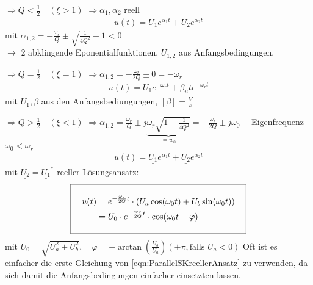 \begin{description}
[style=multiline,topsep=0pt,leftmargin=1.5cm]
\item[(1)]
$\Longrightarrow Q < \frac{1}{2} \quad (\xi > 1)$ \newline
$\Longrightarrow \alpha_1, \alpha_2$ reell
\begin{align}
\boxed{u(t) = U_1 e^{\alpha_1 t} + U_2 e^{\alpha_2 t}}
\end{align}
mit $\alpha_{1,2} = -\frac{\omega_r}{Q} \pm \sqrt{\frac{1}{4Q^2}-1} < 0$ \\
$\longrightarrow$ 2 abklingende Eponentialfunktionen, $U_{1,2}$ aus
Anfangsbedingungen.

\item[(2)]
$\Longrightarrow Q = \frac{1}{2} \quad (\xi = 1)$ \newline
$\Longrightarrow \alpha_{1,2} = -\frac{\omega_r}{2Q} \pm 0 = -\omega_r$
\begin{align}
\boxed{u(t) = U_1 e^{-\omega_r t} + \beta_u t e^{-\omega_r t}}
\end{align} 
mit $U_1, \beta$ aus den Anfangsbediungungen, $[\beta] = \frac{V}{s}$

\item[(3)]
$\Longrightarrow Q > \frac{1}{2} \quad (\xi < 1)$ \newline
$\Longrightarrow \alpha_{1,2} = \frac{\omega_r}{Q} \pm
j\underbrace{\omega_r\sqrt{1-\frac{1}{4Q^2}}}_{=w_0} = -\frac{\omega_r}{2Q} \pm
j \omega_0 \quad $ Eigenfrequenz $\omega_0 < \omega_r$
\begin{align}
\boxed{u(t) = \underline{U_1} e^{\alpha_1 t} + \underline{U_2} e^{\alpha_2 t}}
\end{align}
mit $\underline{U_2} = \underline{U_1}^\ast$ \newline
reeller Lösungsansatz:
\begin{equation}
\addtolength{\fboxsep}{10pt}
\boxed{
	\begin{split}
		u(t) &= e^{-\frac{\omega_r}{2Q}t} \cdot (U_a \cos(\omega_0 t) + 
				U_b \sin(\omega_0 t))\\
 		&= U_0 \cdot e^{-\frac{\omega_r}{2Q}t} \cdot \cos(\omega_0 t + \varphi)
	\end{split}\label{eqn:ParallelSKreellerAnsatz}
	}
\end{equation}
mit $U_0 = \sqrt{U_a^2 + U_b^2}, \quad \varphi = -\arctan(\frac{U_b}{U_a}) (+
\pi, \text{falls } U_a < 0)$ \newline
Oft ist es einfacher die erste Gleichung von \ref{eqn:ParallelSKreellerAnsatz}
zu verwenden, da sich damit die Anfangsbedingungen einfacher einsetzten lassen.
\end{description}


